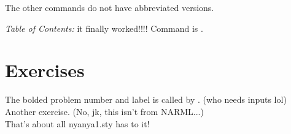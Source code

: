 \documentclass{article}
\begin{document}
The other commands do not have abbreviated versions.

\emph{Table of Contents: }it finally worked!!!! Command is .

\section{Exercises}
\noindent
\exercise The bolded problem number and label is called by . (who needs inputs lol)
\exercise Another exercise. (No, jk, this isn't from NARML...)
\\[4pt]
That's about all nyanya1.sty has to it!\\

\end{document}

